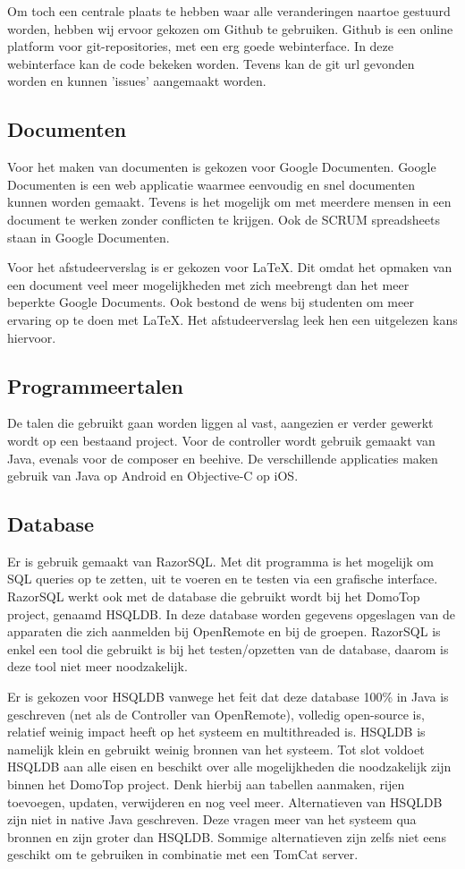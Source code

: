 \documentclass[]{article}
\begin{document}
Om toch een centrale plaats te hebben waar alle veranderingen naartoe
gestuurd worden, hebben wij ervoor gekozen om Github te gebruiken. Github
is een online platform voor git-repositories, met een erg goede
webinterface. In deze webinterface kan de code bekeken worden. Tevens kan de git url
gevonden worden en kunnen 'issues' aangemaakt worden.

\subsection{Documenten}
Voor het maken van documenten is gekozen voor Google Documenten.
Google Documenten is een web applicatie waarmee eenvoudig en
snel documenten kunnen worden gemaakt. Tevens is het mogelijk om met
meerdere mensen in een document te werken zonder conflicten te krijgen. Ook
de SCRUM spreadsheets staan in Google Documenten.

Voor het afstudeerverslag is er gekozen voor \LaTeX. Dit omdat het opmaken
van een document veel meer mogelijkheden met zich meebrengt dan het meer
beperkte Google Documents. Ook bestond de wens bij studenten
om meer ervaring op te doen met \LaTeX\space. Het afstudeerverslag leek hen een uitgelezen kans hiervoor.

\subsection{Programmeertalen}
De talen die gebruikt gaan worden liggen al vast, aangezien er verder 
gewerkt wordt op een bestaand project. Voor de controller wordt gebruik gemaakt van
Java, evenals voor de composer en beehive. De verschillende applicaties maken gebruik
van Java op Android en Objective-C op iOS.

\subsection{Database}
Er is gebruik gemaakt van RazorSQL. Met dit programma is het mogelijk om
SQL queries op te zetten, uit te voeren en te testen via een grafische
interface. RazorSQL werkt ook met de database die gebruikt wordt bij het DomoTop project,
genaamd HSQLDB. In deze database worden gegevens opgeslagen van de
apparaten die zich aanmelden bij OpenRemote en bij de groepen.
RazorSQL is enkel een tool die gebruikt is bij het
testen/opzetten van de database, daarom is deze tool niet meer
noodzakelijk.

Er is gekozen voor HSQLDB vanwege het feit dat deze database 100\% in Java
is geschreven (net als de Controller van OpenRemote), volledig open-source is,
relatief weinig impact heeft op het systeem en multithreaded is.
HSQLDB is namelijk klein en gebruikt weinig bronnen van het systeem. Tot slot voldoet
HSQLDB aan alle eisen en beschikt over alle mogelijkheden die noodzakelijk
zijn binnen het DomoTop project. Denk hierbij aan tabellen aanmaken, rijen
toevoegen, updaten, verwijderen en nog veel meer. Alternatieven van HSQLDB zijn
niet in native Java geschreven. Deze vragen meer van het systeem qua
bronnen en zijn groter dan HSQLDB. Sommige alternatieven zijn zelfs niet
eens geschikt om te gebruiken in combinatie met een TomCat server.
\end{document}
